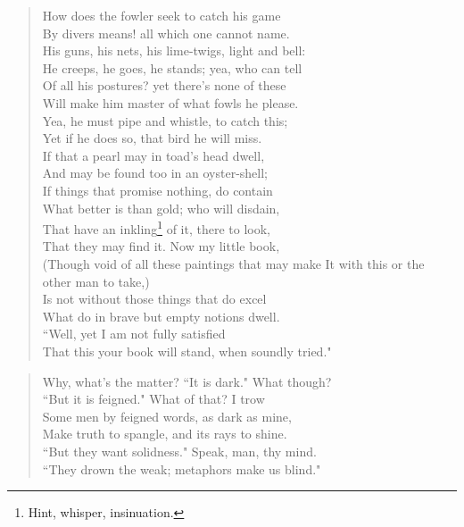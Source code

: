 \begin{verse}
How does the fowler seek to catch his game\\
By divers means! all which one cannot name.\\
His guns, his nets, his lime-twigs, light and bell:\\
He creeps, he goes, he stands; yea, who can tell\\
Of all his postures? yet there's none of these\\
Will make him master of what fowls he please.\\
Yea, he must pipe and whistle, to catch this;\\
Yet if he does so, that bird he will miss.\\
If that a pearl may in toad's head dwell,\\
And may be found too in an oyster-shell;\\
If things that promise nothing, do contain\\
What better is than gold; who will disdain,\\
That have an inkling\footnote{Hint, whisper, insinuation.} of it, there to look,\\
That they may find it. Now my little book,\\
(Though void of all these paintings that may make
It with this or the other man to take,)\\
Is not without those things that do excel\\
What do in brave but empty notions dwell.\\
``Well, yet I am not fully satisfied\\
That this your book will stand, when soundly tried."\\
\end{verse}
\begin{verse}
Why, what's the matter? ``It is dark." What though?\\
``But it is feigned." What of that? I trow\\
Some men by feigned words, as dark as mine,\\
Make truth to spangle, and its rays to shine.\\
``But they want solidness." Speak, man, thy mind.\\
``They drown the weak; metaphors make us blind."\\
\end{verse}
